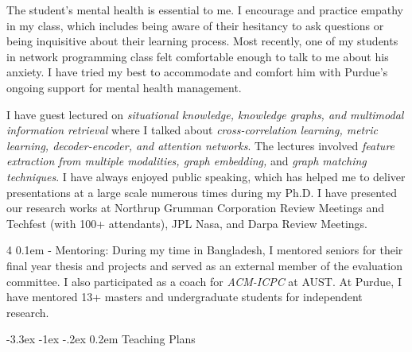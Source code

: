 \documentclass[10pt]{article}
\makeatletter
\def \section {%
    \@startsection {section}
    {1}%
    {\z@}%
    {-3.3ex \@plus -1ex \@minus -.2ex}%
    {0.2em}
    {\normalfont \Large \scshape \bfseries} %
    }
\def \paragraph {%
    \@startsection{paragraph}%
        {4}%
        \z@%
        {0.1em}
        {-\fontdimen 6 \font}%
        {\normalfont \bfseries}%
    }
\makeatother
\begin{document}
The student's mental health is essential to me. I encourage and practice empathy in my class, which includes being aware of their hesitancy to ask questions or being inquisitive about their learning process. Most recently, one of my students in network programming class felt comfortable enough to talk to me about his anxiety. I have tried my best to accommodate and comfort him with Purdue's ongoing support for mental health management.

I have guest lectured on \textit{situational knowledge, knowledge graphs, and multimodal information retrieval} where I talked about \textit{cross-correlation learning, metric learning, decoder-encoder, and attention networks}. The lectures involved \textit{feature extraction from multiple modalities, graph embedding,} and \textit{graph matching techniques}. I have always enjoyed public speaking, which has helped me to deliver presentations at a large scale numerous times during my Ph.D. I have presented our research works at Northrup Grumman Corporation Review Meetings and Techfest (with 100+ attendants), JPL Nasa, and Darpa Review Meetings.

\paragraph{Mentoring:} During my time in Bangladesh, I mentored seniors for their final year thesis and projects and served as an external member of the evaluation committee. I also participated as a coach for
\textit{ACM-ICPC} at AUST.
At Purdue, I have mentored 13+ masters and undergraduate students for independent research. 


\section{Teaching Plans}
% 

\end{document}
